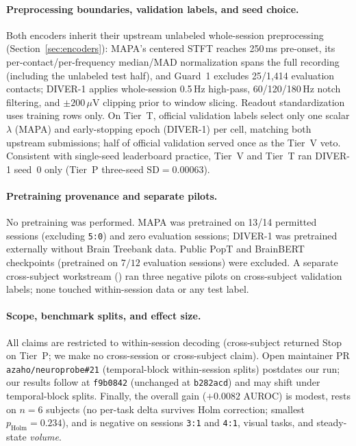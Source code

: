 \documentclass[11pt]{article}
\begin{document}
\paragraph{Preprocessing boundaries, validation labels, and seed choice.}
Both encoders inherit their upstream unlabeled whole-session preprocessing (Section~\ref{sec:encoders}): MAPA's centered STFT reaches 250\,ms pre-onset, its per-contact/per-frequency median/MAD normalization spans the full recording (including the unlabeled test half), and Guard~1 excludes 25/1,414 evaluation contacts; DIVER-1 applies whole-session 0.5\,Hz high-pass, 60/120/180\,Hz notch filtering, and $\pm 200\,\mu\text{V}$ clipping prior to window slicing. Readout standardization uses training rows only. On Tier~T, official validation labels select only one scalar $\lambda$ (MAPA) and early-stopping epoch (DIVER-1) per cell, matching both upstream submissions; half of official validation served once as the Tier~V veto. Consistent with single-seed leaderboard practice, Tier~V and Tier~T ran DIVER-1 seed~0 only (Tier~P three-seed $\text{SD}=0.00063$).

\paragraph{Pretraining provenance and separate pilots.}
No pretraining was performed. MAPA was pretrained on 13/14 permitted sessions (excluding \texttt{5:0}) and zero evaluation sessions; DIVER-1 was pretrained externally without Brain Treebank data. Public PopT and BrainBERT checkpoints (pretrained on $7/12$ evaluation sessions) were excluded. A separate cross-subject workstream () ran three negative pilots on cross-subject validation labels; none touched within-session data or any test label.

\paragraph{Scope, benchmark splits, and effect size.}
All claims are restricted to within-session decoding (cross-subject returned Stop on Tier~P; we make no cross-session or cross-subject claim). Open maintainer PR \texttt{azaho/neuroprobe\#21} (temporal-block within-session splits) postdates our run; our results follow  at \texttt{f9b0842} (unchanged at \texttt{b282acd}) and may shift under temporal-block splits. Finally, the overall gain ($+0.0082$ AUROC) is modest, rests on $n=6$ subjects (no per-task delta survives Holm correction; smallest $p_{\mathrm{Holm}}=0.234$), and is negative on sessions \texttt{3:1} and \texttt{4:1}, visual tasks, and steady-state \emph{volume}.
\end{document}
